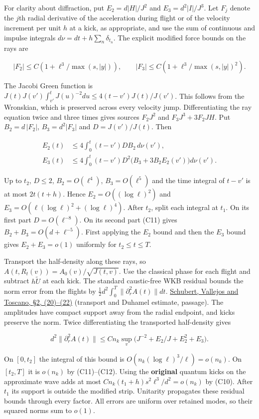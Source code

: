 \documentclass[11pt,a4paper]{article}
\begin{document}
For clarity about diffraction, put \(E_2=d|H|/J^2\) and
\(E_3=d^2|I|/J^3\). Let \(F_j\) denote the \(j\)th radial derivative of
the acceleration during flight or of the velocity increment per unit
\(h\) at a kick, as appropriate, and use the sum of continuous and
impulse integrals \(d\nu=dt+h\sum_n\delta_{t_n}\). The explicit modified
force bounds on the rays are

\[
 |F_2|\le C(1+\ell^3/\max(s,|y|)),\qquad
 |F_3|\le C(1+\ell^3/\max(s,|y|)^2).
\]

The Jacobi Green function is
\(J(t)J(v')\int_{v'}^t J(u)^{-2}du\le4(t-v')J(t)/J(v')\). This follows
from the Wronskian, which is preserved across every velocity jump.
Differentiating the ray equation twice and three times gives sources
\(F_2J^2\) and \(F_3J^3+3F_2JH\). Put \(B_2=d\,|F_2|\), \(B_3=d^2|F_3|\)
and \(D=J(v')/J(t)\). Then

\[
 \begin{aligned}
 E_2(t)&\le4\int_0^t(t-v')D B_2\,d\nu(v'),\\
 E_3(t)&\le4\int_0^t(t-v')D^2
          \bigl(B_3+3B_2 E_2(v')\bigr)d\nu(v').
 \end{aligned}                                                   \tag{C12}
\]

Up to \(t_2\), \(D\le2\), \(B_2=O(\ell^4)\), \(B_3=O(\ell^5)\) and the
time integral of \(t-v'\) is at most \(2t(t+h)\). Hence
\(E_2=O((\log\ell)^2)\) and \(E_3=O(\ell(\log\ell)^2+(\log\ell)^4)\).
After \(t_2\), split each integral at \(t_1\). On its first part
\(D=O(\ell^{-8})\). On its second part (C11) gives
\(B_2+B_3=O(d+\ell^{-5})\). First applying the \(E_2\) bound and then
the \(E_3\) bound gives \(E_2+E_3=o(1)\) uniformly for
\(t_2\le t\le T\).

Transport the half-density along these rays, so
\(A(t,R_t(v))=A_0(v)/\sqrt{J(t,v)}\). Use the classical phase for each
flight and subtract \(h\widetilde U\) at each kick. The standard
caustic-free WKB residual bounds the norm error from the flights by
\(\tfrac12 d^2\int_0^T\|\partial_r^2A(t)\|dt\).
\href{https://arxiv.org/pdf/1112.4056}{Schubert, Vallejos and Toscano,
§2, (20)--(22)} (transport and Duhamel estimate, passage). The
amplitudes have compact support away from the radial endpoint, and kicks
preserve the norm. Twice differentiating the transported half-density
gives

\[
 d^2\|\partial_r^2 A(t)\|\le C n_k
 \sup_v\bigl(J^{-2}+E_2/J+E_2^2+E_3\bigr).
\]

On \([0,t_2]\) the integral of this bound is
\(O(n_k(\log\ell)^3/\ell)=o(n_k)\). On \([t_2,T]\) it is \(o(n_k)\) by
(C11)--(C12). Using the \textbf{original} quantum kicks on the
approximate wave adds at most \(C n_k(t_1+h)s^2\ell^3/d^2=o(n_k)\) by
(C10). After \(t_1\) its support is outside the modified strip.
Unitarity propagates these residual bounds through every factor. All
errors are uniform over retained modes, so their squared norms sum to
\(o(1)\).
\end{document}
